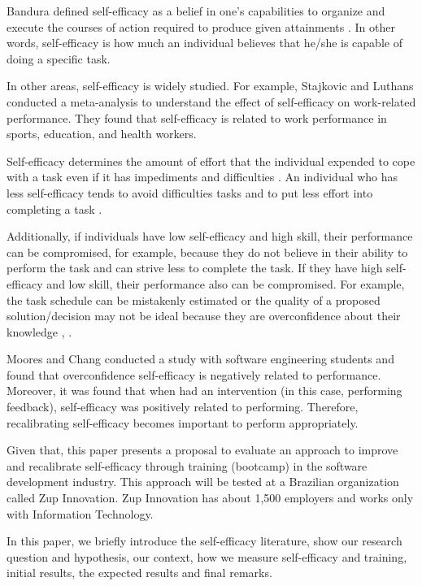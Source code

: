 \documentclass[10pt, conference]{IEEEtran}
\begin{document}
Bandura defined self-efficacy as a belief in one’s capabilities to organize and execute the courses of action required to produce given attainments \cite{bandura1977self}. In other words, self-efficacy is how much an individual believes that he/she is capable of doing a specific task.

In other areas, self-efficacy is widely studied. For example, Stajkovic and Luthans \cite{stajkovic1998self} conducted a meta-analysis to understand the effect of self-efficacy on work-related performance. They found that self-efficacy is related to work performance in sports, education, and health workers.

Self-efficacy determines the amount of effort that the individual expended to cope with a task even if it has impediments and difficulties \cite{bandura1977self}. An individual who has less self-efficacy tends to avoid difficulties tasks and to put less effort into completing a task \cite{artino2012academic}.

Additionally, if individuals have low self-efficacy and high skill, their performance can be compromised, for example, because they do not believe in their ability to perform the task and can strive less to complete the task. If they have high self-efficacy and low skill, their performance also can be compromised. For example, the task schedule can be mistakenly estimated or the quality of a proposed solution/decision may not be ideal because they are overconfidence about their knowledge \cite{vancouver2002two}, \cite{pajares1996self} \cite{schunk2009self}. 

Moores and Chang \cite{moores2009self} conducted a study with software engineering students and found that overconfidence self-efficacy is negatively related to performance. Moreover, it was found that when had an intervention (in this case, performing feedback), self-efficacy was positively related to performing. Therefore, recalibrating self-efficacy becomes important to perform appropriately.

Given that, this paper presents a proposal to evaluate an approach to improve and recalibrate self-efficacy through training (bootcamp) in the software development industry. This approach will be tested at a Brazilian organization called Zup Innovation. Zup Innovation has about 1,500 employers and works only with Information Technology. 

In this paper, we briefly introduce the self-efficacy literature, show our research question and hypothesis, our context, how we measure self-efficacy and training, initial results, the expected results and final remarks.
\end{document}
